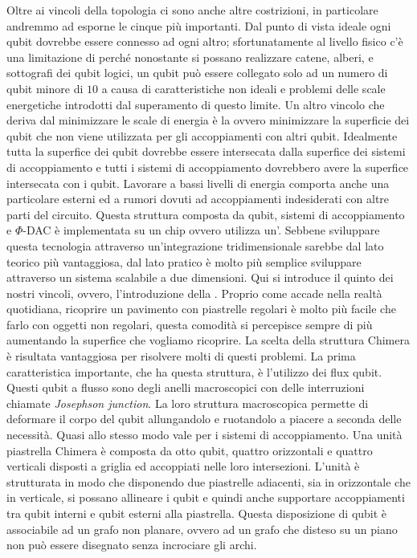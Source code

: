 Oltre ai vincoli della topologia ci sono anche altre costrizioni, in particolare andremmo ad esporne le cinque più importanti. Dal punto di vista ideale ogni qubit dovrebbe essere connesso ad ogni altro; sfortunatamente al livello fisico c'è una limitazione di  perché nonostante si possano realizzare catene, alberi, e sottografi dei qubit logici, un qubit può essere collegato solo ad un numero di qubit minore di $10$ a causa di caratteristiche non ideali e problemi delle scale energetiche introdotti dal superamento di questo limite. Un altro vincolo che deriva dal minimizzare le scale di energia è la  ovvero minimizzare la superficie dei qubit che non viene utilizzata per gli accoppiamenti con altri qubit. Idealmente tutta la superfice dei qubit dovrebbe essere intersecata dalla superfice dei sistemi di accoppiamento e tutti i sistemi di accoppiamento dovrebbero avere la superfice intersecata con i qubit. Lavorare a bassi livelli di energia comporta anche una particolare  esterni ed a rumori dovuti ad accoppiamenti indesiderati con altre parti del circuito. Questa struttura composta da qubit, sistemi di accoppiamento e $\Phi$-DAC è implementata su un chip ovvero utilizza un'. Sebbene sviluppare questa tecnologia attraverso un'integrazione tridimensionale sarebbe dal lato teorico più vantaggiosa, dal lato pratico è molto più semplice sviluppare attraverso un sistema scalabile a due dimensioni. Qui si introduce il quinto dei nostri vincoli, ovvero, l'introduzione della . Proprio come accade nella realtà quotidiana, ricoprire un pavimento con piastrelle regolari è molto più facile che farlo con oggetti non regolari, questa comodità si percepisce sempre di più aumentando la superfice che vogliamo ricoprire.
\cite{ACI}La scelta della struttura Chimera è risultata vantaggiosa per risolvere molti di questi problemi. La prima caratteristica importante, che ha questa struttura, è l'utilizzo dei flux qubit. Questi qubit a flusso sono degli anelli macroscopici con delle interruzioni chiamate \textit{Josephson junction}. La loro struttura macroscopica permette di deformare il corpo del qubit allungandolo e ruotandolo a piacere a seconda delle necessità. Quasi allo stesso modo vale per i sistemi di accoppiamento. Una unità piastrella Chimera è composta da otto qubit, quattro orizzontali e quattro verticali disposti a griglia ed accoppiati nelle loro intersezioni. L'unità è strutturata in modo che disponendo due piastrelle adiacenti, sia in orizzontale che in verticale, si possano allineare i qubit e quindi anche supportare accoppiamenti tra qubit interni e qubit esterni alla piastrella. Questa disposizione di qubit è associabile ad un grafo non planare, ovvero ad un grafo che disteso su un piano non può essere disegnato senza incrociare gli archi.
